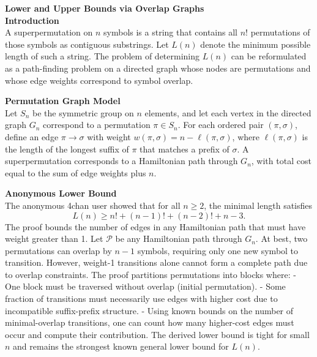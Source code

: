 \begin{technical}
{\Large\textbf{Lower and Upper Bounds via Overlap Graphs}}\\

\noindent\textbf{Introduction}\\
A superpermutation on $n$ symbols is a string that contains all $n!$ permutations of those symbols as contiguous substrings. Let $L(n)$ denote the minimum possible length of such a string. The problem of determining $L(n)$ can be reformulated as a path-finding problem on a directed graph whose nodes are permutations and whose edge weights correspond to symbol overlap.

\noindent\textbf{Permutation Graph Model}\\
Let $S_n$ be the symmetric group on $n$ elements, and let each vertex in the directed graph $G_n$ correspond to a permutation $\pi \in S_n$. For each ordered pair $(\pi, \sigma)$, define an edge $\pi \rightarrow \sigma$ with weight $w(\pi, \sigma) = n - \ell(\pi, \sigma)$, where $\ell(\pi, \sigma)$ is the length of the longest suffix of $\pi$ that matches a prefix of $\sigma$. A superpermutation corresponds to a Hamiltonian path through $G_n$, with total cost equal to the sum of edge weights plus $n$.

\noindent\textbf{Anonymous Lower Bound}\\
The anonymous 4chan user showed that for all $n \geq 2$, the minimal length satisfies
\[
L(n) \geq n! + (n-1)! + (n-2)! + n - 3.
\]
The proof bounds the number of edges in any Hamiltonian path that must have weight greater than 1. Let $\mathcal{P}$ be any Hamiltonian path through $G_n$. At best, two permutations can overlap by $n-1$ symbols, requiring only one new symbol to transition. However, weight-1 transitions alone cannot form a complete path due to overlap constraints. The proof partitions permutations into blocks where:
- One block must be traversed without overlap (initial permutation).
- Some fraction of transitions must necessarily use edges with higher cost due to incompatible suffix-prefix structure.
- Using known bounds on the number of minimal-overlap transitions, one can count how many higher-cost edges must occur and compute their contribution.
The derived lower bound is tight for small $n$ and remains the strongest known general lower bound for $L(n)$.


\end{technical}
